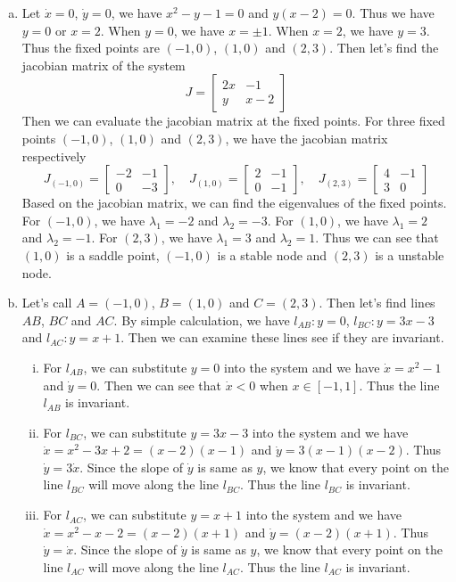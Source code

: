 \documentclass[12pt]{exam}
\begin{document}
\begin{enumerate}[(a)]
	\item Let $\dot{x} = 0$, $\dot{y} = 0$, we have $x^2 - y - 1 = 0$ and $y(x-2) = 0$. Thus we have $y = 0$ or $x = 2$. When $y = 0$, we have $x = \pm 1$. When $x = 2$, we have $y = 3$. Thus the fixed points are $(-1,0)$, $(1,0)$ and $(2,3)$. Then let's find the jacobian matrix of the system
	\[ J = \begin{bmatrix}
		2x & -1 \\
		y & x-2
	\end{bmatrix} \]
	Then we can evaluate the jacobian matrix at the fixed points. For three fixed points $(-1,0)$, $(1,0)$ and $(2,3)$, we have the jacobian matrix respectively
	\[ J_{(-1,0)} = \begin{bmatrix}
		-2 & -1 \\
		0 & -3
	\end{bmatrix}, \quad J_{(1,0)} = \begin{bmatrix}
		2 & -1 \\
		0 & -1
	\end{bmatrix}, \quad J_{(2,3)} = \begin{bmatrix}
		4 & -1 \\
		3 & 0
	\end{bmatrix} \]
	Based on the jacobian matrix, we can find the eigenvalues of the fixed points. For $(-1,0)$, we have $\lambda_1 = -2$ and $\lambda_2 = -3$. For $(1,0)$, we have $\lambda_1 = 2$ and $\lambda_2 = -1$. For $(2,3)$, we have $\lambda_1 = 3$ and $\lambda_2 = 1$. Thus we can see that $(1,0)$ is a saddle point, $(-1,0)$ is a stable node and $(2,3)$ is a unstable node.

\item Let's call $A= (-1,0)$, $B = (1,0)$ and $C = (2,3)$. Then let's find lines $AB$, $BC$ and $AC$. By simple calculation, we have $l_{AB}: y = 0$, $l_{BC}: y = 3x-3$ and $l_{AC}: y = x+1$. Then we can examine these lines see if they are invariant. 
	\begin{enumerate}[(i)]
		\item For $l_{AB}$, we can substitute $y=0$ into the system and we have $\dot{x} = x^2 - 1$ and $\dot{y} = 0$. Then we can see that $\dot{x} < 0$ when $x \in [-1,1]$. Thus the line $l_{AB}$ is invariant.
		\item For $l_{BC}$, we can substitute $y=3x-3$ into the system and we have $\dot{x} = x^2 - 3x + 2 = (x-2)(x-1)$ and $\dot{y} = 3(x-1)(x-2)$. Thus $\dot{y} = 3\dot{x}$. Since the slope of $\dot{y}$ is same as $y$, we know that every point on the line $l_{BC}$ will move along the line $l_{BC}$. Thus the line $l_{BC}$ is invariant. 
		\item For $l_{AC}$, we can substitute $y=x+1$ into the system and we have $\dot{x} = x^2 - x - 2 = (x-2)(x+1)$ and $\dot{y} = (x-2)(x+1)$. Thus $\dot{y} = \dot{x}$. Since the slope of $\dot{y}$ is same as $y$, we know that every point on the line $l_{AC}$ will move along the line $l_{AC}$. Thus the line $l_{AC}$ is invariant.
	\end{enumerate}


\end{enumerate}
\end{document}
